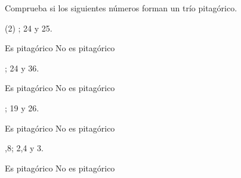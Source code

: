 \documentclass[sin nombre,con autor]{plantilla-evaluacion-v1}
\begin{document}
Comprueba si los siguientes números forman un trío pitagórico.
\begin{preguntas}(2)
  ; 24 y 25. \\
  \begin{vertical}
    \alternativa Es pitagórico
    \alternativa No es pitagórico
  \end{vertical}
  \begin{malla}[height=3cm]
  \end{malla}
  ; 24 y 36. \\
  \begin{vertical}
    \alternativa Es pitagórico
    \alternativa No es pitagórico
  \end{vertical}
  \begin{malla}[height=3cm]
  \end{malla}
  ; 19 y 26. \\
  \begin{vertical}
    \alternativa Es pitagórico
    \alternativa No es pitagórico
  \end{vertical}
  \begin{malla}[height=3cm]
  \end{malla}
  ,8; 2,4 y 3. \\
  \begin{vertical}
    \alternativa Es pitagórico
    \alternativa No es pitagórico
  \end{vertical}
  \begin{malla}[height=3cm]
  \end{malla}
\end{preguntas}
\end{document}
